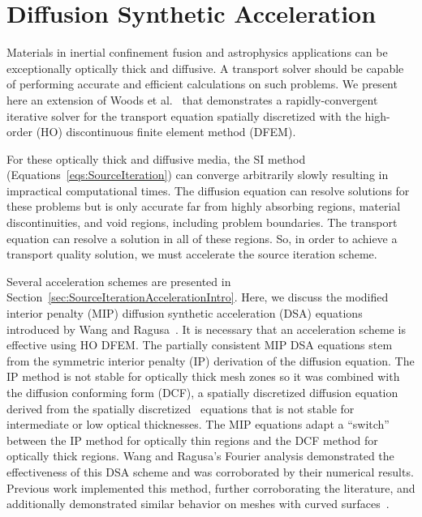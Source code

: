 \documentclass[12pt]{article}
\begin{document}
\setlength{\abovedisplayskip}{5pt}
\setlength{\belowdisplayskip}{5pt}

\section{Diffusion Synthetic Acceleration}
\label{sec:DSA}
Materials in inertial confinement fusion and astrophysics applications can be exceptionally optically thick and diffusive. A transport solver should be capable of performing accurate and efficient calculations on such problems. We present here an extension of Woods et al.~\cite{WoodsHoDgfemXyCurved} that demonstrates a rapidly-convergent iterative solver for the transport equation spatially discretized with the high-order (HO) discontinuous finite element method (DFEM).

For these optically thick and diffusive media, the SI method (Equations~\ref{eqs:SourceIteration}) can converge arbitrarily slowly resulting in impractical computational times. The diffusion equation can resolve solutions for these problems but is only accurate far from highly absorbing regions, material discontinuities, and void regions, including problem boundaries. The transport equation can resolve a solution in all of these regions. So, in order to achieve a transport quality solution, we must accelerate the source iteration scheme.

Several acceleration schemes are presented in Section~\ref{sec:SourceIterationAccelerationIntro}. Here, we discuss the modified interior penalty (MIP) diffusion synthetic acceleration (DSA) equations introduced by Wang and Ragusa~\cite{WangRagusaDSA}. It is necessary that an acceleration scheme is effective using HO DFEM. The partially consistent MIP DSA equations stem from the symmetric interior penalty (IP) derivation of the diffusion equation. The IP method is not stable for optically thick mesh zones so it was combined with the diffusion conforming form (DCF), a spatially discretized diffusion equation derived from the spatially discretized \SN\ equations that is not stable for intermediate or low optical thicknesses. The MIP equations adapt a ``switch'' between the IP method for optically thin regions and the DCF method for optically thick regions. Wang and Ragusa's Fourier analysis demonstrated the effectiveness of this DSA scheme and was corroborated by their numerical results. Previous work implemented this method, further corroborating the literature, and additionally demonstrated similar behavior on meshes with curved surfaces~\cite{WoodsDSA}.
\end{document}
